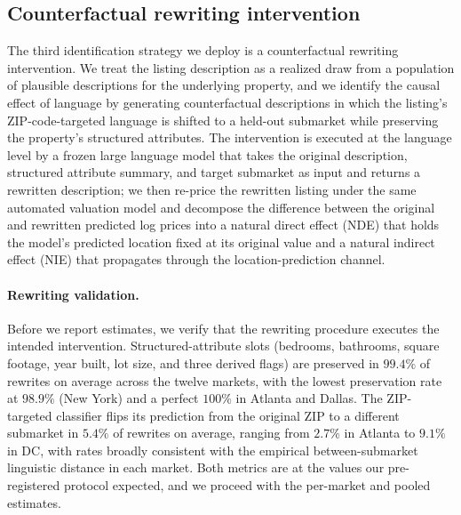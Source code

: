 
\subsection{Counterfactual rewriting intervention}
\label{sec:counterfactual-12}

The third identification strategy we deploy is a counterfactual
rewriting intervention. We treat the listing description as a
realized draw from a population of plausible descriptions for the
underlying property, and we identify the causal effect of language by
generating counterfactual descriptions in which the listing's
ZIP-code-targeted language is shifted to a held-out submarket while
preserving the property's structured attributes. The intervention is
executed at the language level by a frozen large language model that
takes the original description, structured attribute summary, and
target submarket as input and returns a rewritten description; we
then re-price the rewritten listing under the same automated
valuation model and decompose the difference between the original and
rewritten predicted log prices into a natural direct effect (NDE)
that holds the model's predicted location fixed at its original value
and a natural indirect effect (NIE) that propagates through the
location-prediction channel.

\paragraph{Rewriting validation.} Before we report estimates, we
verify that the rewriting procedure executes the intended
intervention. Structured-attribute slots (bedrooms, bathrooms,
square footage, year built, lot size, and three derived flags) are
preserved in $99.4\%$ of rewrites on average across the twelve
markets, with the lowest preservation rate at $98.9\%$ (New York)
and a perfect $100\%$ in Atlanta and Dallas. The ZIP-targeted
classifier flips its prediction from the original ZIP to a different
submarket in $5.4\%$ of rewrites on average, ranging from $2.7\%$ in
Atlanta to $9.1\%$ in DC, with rates broadly consistent with the
empirical between-submarket linguistic distance in each market.
Both metrics are at the values our pre-registered protocol expected,
and we proceed with the per-market and pooled estimates.


